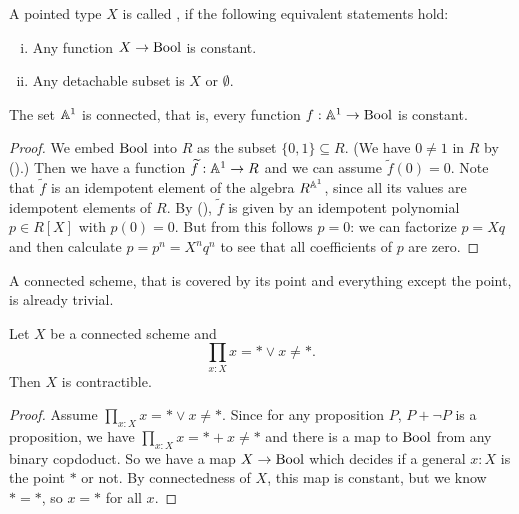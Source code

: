 \begin{definition}%
  \label{connected}
  A pointed type $X$ is called ,
  if the following equivalent statements hold:
  \begin{enumerate}[(i)]
  \item Any function $X\to \mathrm{Bool}$ is constant.
  \item Any detachable subset is $X$ or $\emptyset$.
  \end{enumerate}
\end{definition}

\begin{proposition}%
  \label{A1-connected}
  The set $\mathbb{A}^1$ is connected, that is,
  every function $f : \mathbb{A}^1 \to \mathrm{Bool}$ is constant.
\end{proposition}

\begin{proof}
  We embed $\mathrm{Bool}$ into $R$ as the subset $\{0, 1\} \subseteq R$.
  (We have $0 \neq 1$ in $R$ by ().)
  Then we have a function $\widetilde{f} : \mathbb{A}^1 \to R$
  and we can assume $\widetilde{f}(0) = 0$.
  Note that $\widetilde{f}$ is an idempotent element of the algebra $R^{\mathbb{A}^1}$,
  since all its values are idempotent elements of $R$.
  By (),
  $\widetilde{f}$ is given by an idempotent polynomial $p \in R[X]$
  with $p(0) = 0$.
  But from this follows $p = 0$:
  we can factorize $p = X q$
  and then calculate $p = p^n = X^n q^n$
  to see that all coefficients of $p$ are zero.
\end{proof}

A connected scheme, that is covered by its point and everything except the point,
is already trivial.

\begin{corollary}%
  \label{connected-to-contractible}
  Let $X$ be a connected scheme and 
  \[\prod_{x:X}x=* \vee x\neq *.\]
  Then $X$ is contractible.
\end{corollary}

\begin{proof}
  Assume $\prod_{x:X}x=* \vee x\neq *$.
  Since for any proposition $P$, $P + \neg P$ is a proposition,
  we have $\prod_{x:X}x=* + x\neq *$ and there is a map to $\mathrm{Bool}$ from any binary copdoduct.
  So we have a map $X\to \mathrm{Bool}$
  which decides if a general $x:X$ is the point $*$ or not.
  By connectedness of $X$, this map is constant, but we know $*=*$,
  so $x=*$ for all $x$.
\end{proof}

